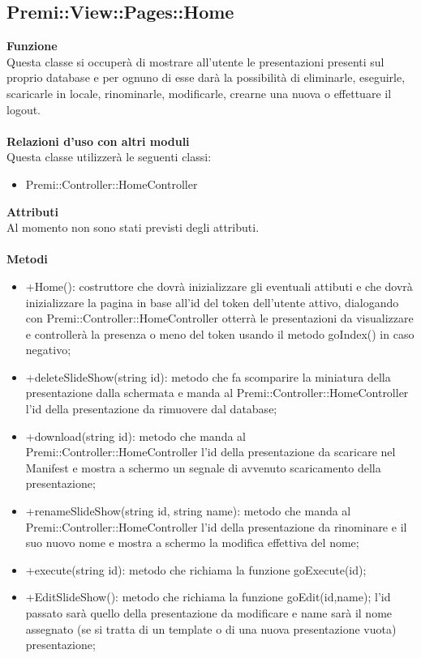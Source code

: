 {				\subsection{Premi::View::Pages::Home}{
						\textbf{Funzione}\\
						\indent Questa classe si occuperà di mostrare all'utente le presentazioni presenti sul proprio database e per ognuno di esse darà la possibilità di eliminarle, eseguirle, scaricarle in locale, rinominarle, modificarle, crearne una nuova o effettuare il logout.\\\\
						\textbf{Relazioni d'uso con altri moduli}\\
						\indent Questa classe utilizzerà le seguenti classi:
						\begin{itemize}
							\item Premi::Controller::HomeController
						\end{itemize}
						\textbf{Attributi}\\
						\indent Al momento non sono stati previsti degli attributi.\\\\
						\textbf{Metodi}
						\begin{itemize}
							\item +Home(): costruttore che dovrà inizializzare gli eventuali attibuti e che dovrà inizializzare la pagina in base all'id del token dell'utente attivo, dialogando con Premi::Controller::HomeController otterrà le presentazioni da visualizzare e controllerà la presenza o meno del token usando il metodo goIndex() in caso negativo;
							\item +deleteSlideShow(string id): metodo che fa scomparire la miniatura della presentazione dalla schermata e manda al Premi::Controller::HomeController l'id della presentazione da rimuovere dal database;
							\item +download(string id): metodo che manda al Premi::Controller::HomeController l'id della presentazione da scaricare nel Manifest e mostra a schermo un segnale di avvenuto scaricamento della presentazione;
							\item +renameSlideShow(string id, string name): metodo che manda al Premi::Controller::HomeController l'id della presentazione da rinominare e il suo nuovo nome e mostra a schermo la modifica effettiva del nome;
							\item +execute(string id): metodo che richiama la funzione goExecute(id);
							\item +EditSlideShow(): metodo che richiama la funzione goEdit(id,name); l'id passato sarà quello della presentazione da modificare e name sarà il nome assegnato (se si tratta di un template o di una nuova presentazione vuota) presentazione;

\end{itemize}}}
